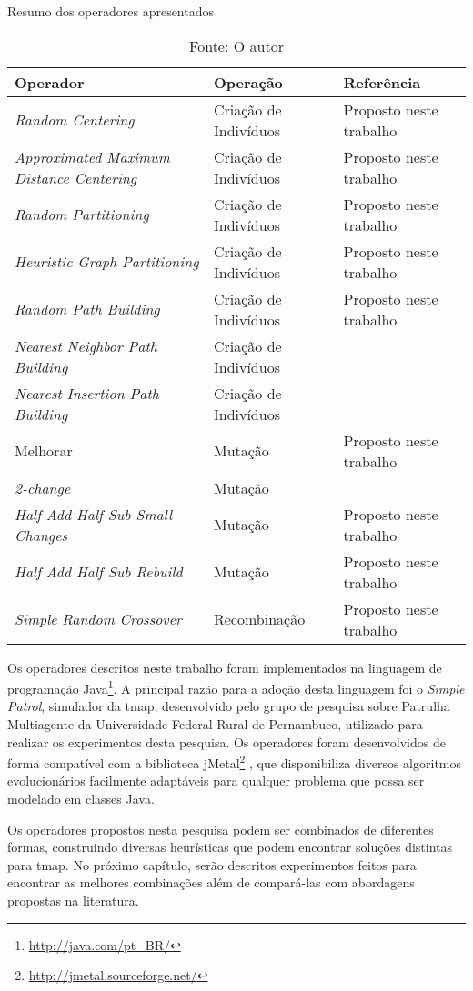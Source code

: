 \begin{table}[bh]
	\centering
	\caption{Resumo dos operadores apresentados}
	\label{tbl:resumo_operadores}
	\begin{tabularx}{\linewidth}{|X|X|X|}
		\hline
		\textbf{Operador} & \textbf{Operação} & \textbf{Referência} \\
		\hline
		\textit{Random Centering} & Criação de Indivíduos & Proposto neste trabalho \\
		\hline
		\textit{Approximated Maximum Distance Centering} & Criação de Indivíduos & Proposto neste trabalho \\
		\hline
		\textit{Random Partitioning} & Criação de Indivíduos & Proposto neste trabalho \\
		\hline
		\textit{Heuristic Graph Partitioning} & Criação de Indivíduos & Proposto neste trabalho \\
		\hline
		\textit{Random Path Building} & Criação de Indivíduos & Proposto neste trabalho \\
		\hline
		\textit{Nearest Neighbor Path Building} & Criação de Indivíduos & \citep{nilsson2003heuristics} \\
		\hline
		\textit{Nearest Insertion Path Building} & Criação de Indivíduos & \citep{nilsson2003heuristics} \\
		\hline
		Melhorar & Mutação & Proposto neste trabalho \\
		\hline
		\textit{2-change} & Mutação & \citep{Marx:2008:SKN:2283963.2284596} \\
		\hline
		\textit{Half Add Half Sub Small Changes} & Mutação & Proposto neste trabalho \\
		\hline
		\textit{Half Add Half Sub Rebuild} & Mutação & Proposto neste trabalho \\
		\hline
		\textit{Simple Random Crossover} & Recombinação & Proposto neste trabalho \\
		\hline
	\end{tabularx}
	\caption*{Fonte: O autor}
\end{table}

Os operadores descritos neste trabalho foram implementados na linguagem de 
programação Java\footnote{\url{http://java.com/pt_BR/}}. A principal razão para 
a adoção desta linguagem foi o \textit{Simple Patrol}, simulador da \ac{tmap}, 
desenvolvido pelo grupo de pesquisa sobre Patrulha Multiagente da Universidade 
Federal Rural de Pernambuco, utilizado para realizar os experimentos desta 
pesquisa. Os operadores foram desenvolvidos de forma compatível com a biblioteca 
jMetal\footnote{\url{http://jmetal.sourceforge.net/}} \citep{Durillo2011}, que 
disponibiliza diversos algoritmos evolucionários facilmente adaptáveis para 
qualquer problema que possa ser modelado em classes Java.

Os operadores propostos nesta pesquisa podem ser combinados de diferentes 
formas, construindo diversas heurísticas que podem encontrar soluções distintas 
para \ac{tmap}. No próximo capítulo, serão descritos experimentos feitos para 
encontrar as melhores combinações além de compará-las com abordagens propostas 
na literatura.